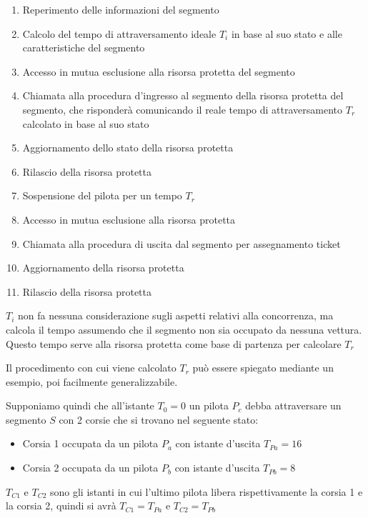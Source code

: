 \documentclass[a4paper,11pt, twoside, openright]{book}
\begin{document}
      \begin{enumerate}
	\item Reperimento delle informazioni del segmento
	\item Calcolo del tempo di attraversamento ideale $T_i$ in base al suo stato e alle caratteristiche del segmento
	\item Accesso in mutua esclusione alla risorsa protetta del segmento
	\item Chiamata alla procedura d'ingresso al segmento della risorsa protetta del segmento, che risponderà comunicando 
	      il reale tempo di attraversamento $T_r$ calcolato in base al suo stato
	\item Aggiornamento dello stato della risorsa protetta
	\item Rilascio della risorsa protetta
	\item Sospensione del pilota per un tempo $T_r$
	\item Accesso in mutua esclusione alla risorsa protetta
	\item Chiamata alla procedura di uscita dal segmento per assegnamento ticket
	\item Aggiornamento della risorsa protetta
	\item Rilascio della risorsa protetta
      \end{enumerate}
      
      $T_i$ non fa nessuna considerazione sugli aspetti relativi alla concorrenza, ma calcola il tempo
      assumendo che il segmento non sia occupato da nessuna vettura. Questo tempo serve alla risorsa protetta come
      base di partenza per calcolare $T_r$
      
      Il procedimento con cui viene calcolato $T_r$ può essere spiegato mediante un esempio,
      poi facilmente generalizzabile.
      
      Supponiamo quindi che all'istante $T_0=0$ un pilota $P_c$ debba attraversare un segmento $S$ 
      con 2 corsie che si trovano nel seguente stato:
      
      \begin{itemize}
	\item Corsia 1 occupata da un pilota $P_a$ con istante d'uscita $T_{Pa}=16$
	\item Corsia 2 occupata da un pilota $P_b$ con istante d'uscita $T_{Pb}=8$
      \end{itemize}
      
      $T_{C1}$ e $T_{C2}$ sono gli istanti in cui l'ultimo pilota libera rispettivamente la corsia 1
      e la corsia 2, quindi si avrà $T_{C1} = T_{Pa}$ e $T_{C2} = T_{Pb}$
      
\end{document}
